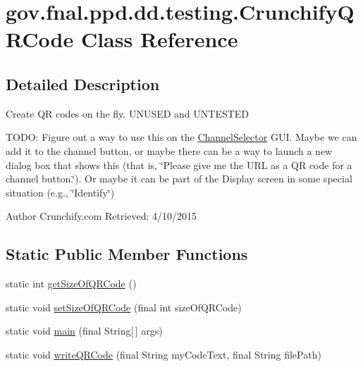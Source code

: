 \hypertarget{classgov_1_1fnal_1_1ppd_1_1dd_1_1testing_1_1CrunchifyQRCode}{\section{gov.\-fnal.\-ppd.\-dd.\-testing.\-Crunchify\-Q\-R\-Code Class Reference}
\label{classgov_1_1fnal_1_1ppd_1_1dd_1_1testing_1_1CrunchifyQRCode}
}


\subsection{Detailed Description}
Create Q\-R codes on the fly. U\-N\-U\-S\-E\-D and U\-N\-T\-E\-S\-T\-E\-D

T\-O\-D\-O\-: Figure out a way to use this on the \hyperlink{classgov_1_1fnal_1_1ppd_1_1dd_1_1ChannelSelector}{Channel\-Selector} G\-U\-I. Maybe we can add it to the channel button, or maybe there can be a way to launch a new dialog box that shows this (that is, \char`\"{}\-Please give me the U\-R\-L as a Q\-R code for a channel button.\char`\"{}). Or maybe it can be part of the Display screen in some special situation (e.\-g., \char`\"{}\-Identify\char`\"{})

\begin{DoxyAuthor}{Author}
Crunchify.\-com Retrieved\-: 4/10/2015 
\end{DoxyAuthor}
\subsection*{Static Public Member Functions}
\begin{DoxyCompactItemize}
\item 
static int \hyperlink{classgov_1_1fnal_1_1ppd_1_1dd_1_1testing_1_1CrunchifyQRCode_af4be69ca0eb9d5feb41321c2e83ec82c}{get\-Size\-Of\-Q\-R\-Code} ()
\item 
static void \hyperlink{classgov_1_1fnal_1_1ppd_1_1dd_1_1testing_1_1CrunchifyQRCode_a1ebe1abb8380d254de65ba4879e2ae5e}{set\-Size\-Of\-Q\-R\-Code} (final int size\-Of\-Q\-R\-Code)
\item 
static void \hyperlink{classgov_1_1fnal_1_1ppd_1_1dd_1_1testing_1_1CrunchifyQRCode_aaca0af77f34556399df2292994d3c4f5}{main} (final String\mbox{[}$\,$\mbox{]} args)
\item 
static void \hyperlink{classgov_1_1fnal_1_1ppd_1_1dd_1_1testing_1_1CrunchifyQRCode_a2d32209f16dc9bd5b114512ed653fb7a}{write\-Q\-R\-Code} (final String my\-Code\-Text, final String file\-Path)
\end{DoxyCompactItemize}


